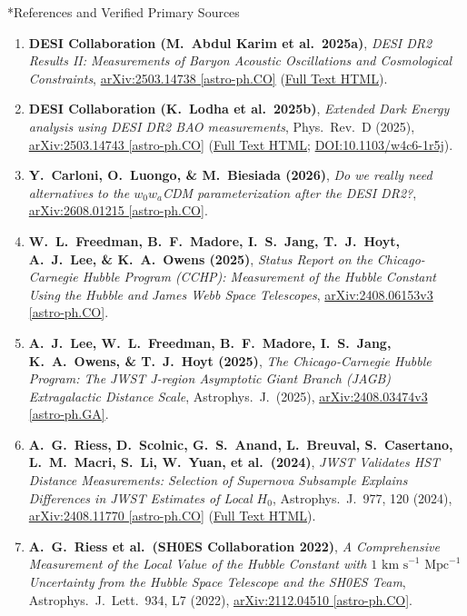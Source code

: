 \documentclass[11pt,letterpaper]{article}
\makeatletter
\renewcommand{\section}{\@startsection{section}{1}{\z@}%
  {-16pt \@plus -4pt \@minus -2pt}%
  {8pt \@plus 2pt}%
  {\normalfont\Large\bfseries\color{primary}}}
\let\orig@section\section
\renewcommand{\section}{\@ifstar{\star@section}{\nostar@section}}
\newcommand{\nostar@section}[1]{%
  \orig@section{#1}%
  \vspace{-6pt}\noindent{\color{tealaccent}\rule{\textwidth}{1.5pt}}\vspace{4pt}\par\nobreak%
}
\newcommand{\star@section}[1]{%
  \orig@section*{#1}%
  \vspace{-6pt}\noindent{\color{tealaccent}\rule{\textwidth}{1.5pt}}\vspace{4pt}\par\nobreak%
}
\makeatother
\begin{document}
\section*{References and Verified Primary Sources}
\small
\begin{enumerate}
    \setlength{\itemsep}{3pt}
    \item \textbf{DESI Collaboration (M.\ Abdul Karim et al.\ 2025a)}, \emph{DESI DR2 Results II: Measurements of Baryon Acoustic Oscillations and Cosmological Constraints}, \href{https://arxiv.org/abs/2503.14738}{arXiv:2503.14738 [astro-ph.CO]} (\href{https://arxiv.org/html/2503.14738v1}{Full Text HTML}).
    \item \textbf{DESI Collaboration (K.\ Lodha et al.\ 2025b)}, \emph{Extended Dark Energy analysis using DESI DR2 BAO measurements}, Phys.\ Rev.\ D (2025), \href{https://arxiv.org/abs/2503.14743}{arXiv:2503.14743 [astro-ph.CO]} (\href{https://arxiv.org/html/2503.14743v2}{Full Text HTML}; \href{https://link.aps.org/doi/10.1103/w4c6-1r5j}{DOI:10.1103/w4c6-1r5j}).
    \item \textbf{Y.\ Carloni, O.\ Luongo, \& M.\ Biesiada (2026)}, \emph{Do we really need alternatives to the $w_0 w_a$CDM parameterization after the DESI DR2?}, \href{https://arxiv.org/pdf/2608.01215}{arXiv:2608.01215 [astro-ph.CO]}.
    \item \textbf{W.\ L.\ Freedman, B.\ F.\ Madore, I.\ S.\ Jang, T.\ J.\ Hoyt, A.\ J.\ Lee, \& K.\ A.\ Owens (2025)}, \emph{Status Report on the Chicago-Carnegie Hubble Program (CCHP): Measurement of the Hubble Constant Using the Hubble and James Webb Space Telescopes}, \href{https://arxiv.org/abs/2408.06153}{arXiv:2408.06153v3 [astro-ph.CO]}.
    \item \textbf{A.\ J.\ Lee, W.\ L.\ Freedman, B.\ F.\ Madore, I.\ S.\ Jang, K.\ A.\ Owens, \& T.\ J.\ Hoyt (2025)}, \emph{The Chicago-Carnegie Hubble Program: The JWST J-region Asymptotic Giant Branch (JAGB) Extragalactic Distance Scale}, Astrophys.\ J.\ (2025), \href{https://arxiv.org/abs/2408.03474}{arXiv:2408.03474v3 [astro-ph.GA]}.
    \item \textbf{A.\ G.\ Riess, D.\ Scolnic, G.\ S.\ Anand, L.\ Breuval, S.\ Casertano, L.\ M.\ Macri, S.\ Li, W.\ Yuan, et al.\ (2024)}, \emph{JWST Validates HST Distance Measurements: Selection of Supernova Subsample Explains Differences in JWST Estimates of Local $H_0$}, Astrophys.\ J.\ 977, 120 (2024), \href{https://arxiv.org/abs/2408.11770}{arXiv:2408.11770 [astro-ph.CO]} (\href{https://arxiv.org/html/2408.11770v2}{Full Text HTML}).
    \item \textbf{A.\ G.\ Riess et al.\ (SH0ES Collaboration 2022)}, \emph{A Comprehensive Measurement of the Local Value of the Hubble Constant with $1\text{ km s}^{-1}\text{ Mpc}^{-1}$ Uncertainty from the Hubble Space Telescope and the SH0ES Team}, Astrophys.\ J.\ Lett.\ 934, L7 (2022), \href{https://arxiv.org/pdf/2112.04510}{arXiv:2112.04510 [astro-ph.CO]}.

\end{enumerate}
\end{document}
